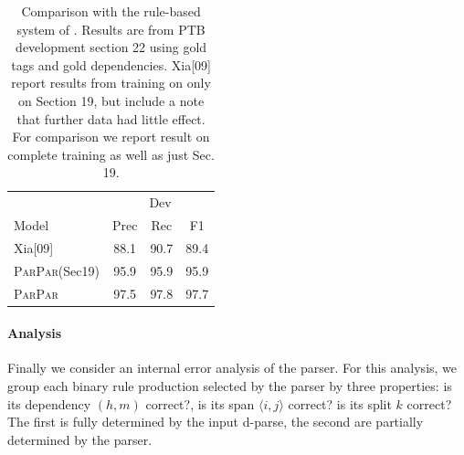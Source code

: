 \documentclass[11pt,letterpaper]{article}
\newcommand{\Span}[1]{\langle #1 \rangle}
\newcommand{\ParseName}{\textsc{ParPar}}
\begin{document}
\begin{table}
  \centering
  \begin{tabular}{|l|ccc|}

    \hline
    & \multicolumn{3}{|c|}{Dev} \\
    Model & Prec & Rec & F1  \\
    \hline

    \hline
    Xia[09]     & 88.1 & 90.7 & 89.4 \\
    \ParseName(Sec19)  & 95.9 & 95.9 & 95.9    \\
    \ParseName  & 97.5 & 97.8 & 97.7    \\
    \hline

  \end{tabular}
  \caption{Comparison with the rule-based system of .
    Results are from PTB development section 22 using gold tags and gold
    dependencies.
    Xia[09] report results from training on only on Section 19, but
    include a note that further data had little effect.
    For comparison we report result on complete training as well as just Sec. 19.
  }
  \label{tab:convert}
\end{table}





\paragraph{Analysis}
\label{sec:analysis}

Finally we consider an internal error analysis of
the parser. For this analysis, we group each binary rule production
selected by the parser by three properties:
is its dependency $(h, m)$ correct?, is its span $\Span{i,j}$ correct? 
is its split $k$ correct? The first is fully determined by the 
input d-parse, the second are partially determined by the parser. 
\end{document}
